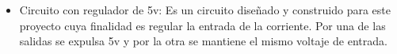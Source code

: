 \begin{itemize}
\item Circuito con regulador de 5v: Es un circuito diseñado y construido para este proyecto cuya finalidad es regular la entrada de la corriente. Por una de las salidas se expulsa 5v y por la otra se mantiene el mismo voltaje de entrada. 

\end{itemize}



